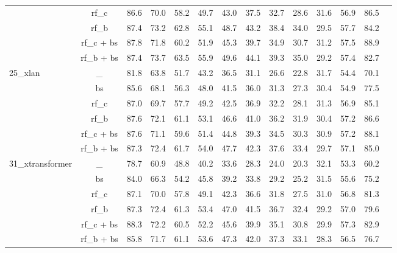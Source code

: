 \documentclass[journal,comsoc]{IEEEtran}
\begin{document}
\begin{table*}[htp]
\begin{tabular}{l|c|cccccccccccc}
                                  & rf\_c      & 86.6    & 70.0    & 58.2    & 49.7    & 43.0    & 37.5    & 32.7    & 28.6    & 31.6   & 56.9     & 86.5  \\
                                  & rf\_b      & 87.4    & 73.2    & 62.8    & 55.1    & 48.7    & 43.2    & 38.4    & 34.0    & 29.5   & 57.7     & 84.2  \\
                                  & rf\_c + bs & 87.8    & 71.8    & 60.2    & 51.9    & 45.3    & 39.7    & 34.9    & 30.7    & 31.2   & 57.5     & 88.9  \\
                                  & rf\_b + bs & 87.4    & 73.7    & 63.5    & 55.9    & 49.6    & 44.1    & 39.3    & 35.0    & 29.2   & 57.4     & 82.7  \\
\multirow{6}{*}{25\_xlan}         & \_         & 81.8    & 63.8    & 51.7    & 43.2    & 36.5    & 31.1    & 26.6    & 22.8    & 31.7   & 54.4     & 70.1  \\
                                  & bs         & 85.6    & 68.1    & 56.3    & 48.0    & 41.5    & 36.0    & 31.3    & 27.3    & 30.4   & 54.9     & 77.5  \\
                                  & rf\_c      & 87.0    & 69.7    & 57.7    & 49.2    & 42.5    & 36.9    & 32.2    & 28.1    & 31.3   & 56.9     & 85.1  \\
                                  & rf\_b      & 87.6    & 72.1    & 61.1    & 53.1    & 46.6    & 41.0    & 36.2    & 31.9    & 30.4   & 57.2     & 86.6  \\
                                  & rf\_c + bs & 87.6    & 71.1    & 59.6    & 51.4    & 44.8    & 39.3    & 34.5    & 30.3    & 30.9   & 57.2     & 88.1  \\
                                  & rf\_b + bs & 87.3    & 72.4    & 61.7    & 54.0    & 47.7    & 42.3    & 37.6    & 33.4    & 29.7   & 57.1     & 85.0  \\
\multirow{6}{*}{31\_xtransformer} & \_         & 78.7    & 60.9    & 48.8    & 40.2    & 33.6    & 28.3    & 24.0    & 20.3    & 32.1   & 53.3     & 60.2  \\
                                  & bs         & 84.0    & 66.3    & 54.2    & 45.8    & 39.2    & 33.8    & 29.2    & 25.2    & 31.5   & 55.6     & 75.2  \\
                                  & rf\_c      & 87.1    & 70.0    & 57.8    & 49.1    & 42.3    & 36.6    & 31.8    & 27.5    & 31.0   & 56.8     & 81.3  \\
                                  & rf\_b      & 87.3    & 72.4    & 61.3    & 53.4    & 47.0    & 41.5    & 36.7    & 32.4    & 29.2   & 57.0     & 79.6  \\
                                  & rf\_c + bs & 88.3    & 72.2    & 60.5    & 52.2    & 45.6    & 39.9    & 35.1    & 30.8    & 29.9   & 57.3     & 82.9  \\
                                  & rf\_b + bs & 85.8    & 71.7    & 61.1    & 53.6    & 47.3    & 42.0    & 37.3    & 33.1    & 28.3   & 56.5     & 76.7    \\ \hline
\end{tabular}
\end{table*}
\end{document}
